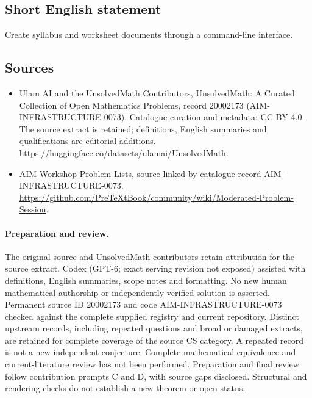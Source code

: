 \documentclass[11pt]{article}
\begin{document}
\subsection{Short English statement}
Create syllabus and worksheet documents through a command-line interface.
\subsection{Sources}
\begin{itemize}
\item[\hypertarget{source:20002173:1}{S1}] Ulam AI and the UnsolvedMath Contributors, UnsolvedMath: A Curated Collection of Open Mathematics Problems, record 20002173 (AIM-INFRASTRUCTURE-0073). Catalogue curation and metadata: CC BY 4.0. The source extract is retained; definitions, English summaries and qualifications are editorial additions.
\url{https://huggingface.co/datasets/ulamai/UnsolvedMath}.
\item[\hypertarget{source:20002173:2}{S2}] AIM Workshop Problem Lists, source linked by catalogue record AIM-INFRASTRUCTURE-0073.
\url{https://github.com/PreTeXtBook/community/wiki/Moderated-Problem-Session}.
\end{itemize}
\paragraph{Preparation and review.}
The original source and UnsolvedMath contributors retain attribution for the source extract. Codex (GPT-6; exact serving revision not exposed) assisted with definitions, English summaries, scope notes and formatting. No new human mathematical authorship or independently verified solution is asserted. Permanent source ID 20002173 and code AIM-INFRASTRUCTURE-0073 checked against the complete supplied registry and current repository. Distinct upstream records, including repeated questions and broad or damaged extracts, are retained for complete coverage of the source CS category. A repeated record is not a new independent conjecture. Complete mathematical-equivalence and current-literature review has not been performed. Preparation and final review follow contribution prompts C and D, with source gaps disclosed. Structural and rendering checks do not establish a new theorem or open status.
\label{end:20002173}
\end{document}
